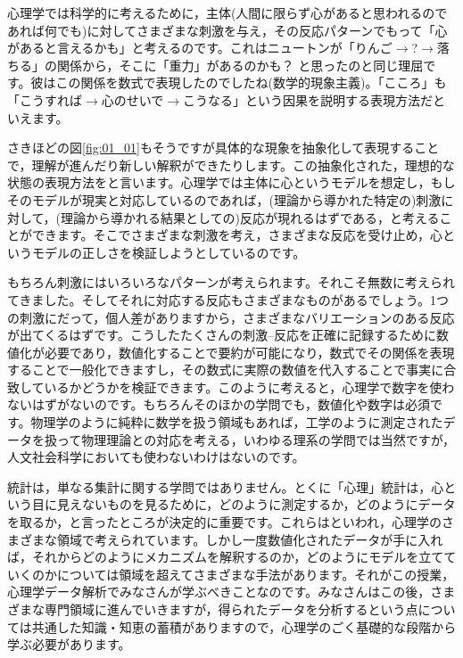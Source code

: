 \documentclass{ltjsbook}
\begin{document}
心理学では科学的に考えるために，主体(人間に限らず心があると思われるのであれば何でも)に対してさまざまな刺激を与え，その反応パターンでもって「心があると言えるかも」と考えるのです。これはニュートンが「りんご$\to$?$\to$落ちる」の関係から，そこに「重力」があるのかも？ と思ったのと同じ理屈です。彼はこの関係を数式で表現したのでしたね(数学的現象主義)。「こころ」も「こうすれば$\to$心のせいで$\to$こうなる」という因果を説明する表現方法だといえます。

さきほどの図\ref{fig:01_01}もそうですが具体的な現象を抽象化して表現することで，理解が進んだり新しい解釈ができたりします。この抽象化された，理想的な状態の表現方法をと言います。心理学では主体に心というモデルを想定し，もしそのモデルが現実と対応しているのであれば，(理論から導かれた特定の)刺激に対して，(理論から導かれる結果としての)反応が現れるはずである，と考えることができます。そこでさまざまな刺激を考え，さまざまな反応を受け止め，心というモデルの正しさを検証しようとしているのです。

もちろん刺激にはいろいろなパターンが考えられます。それこそ無数に考えられてきました。そしてそれに対応する反応もさまざまなものがあるでしょう。1つの刺激にだって，個人差がありますから，さまざまなバリエーションのある反応が出てくるはずです。こうしたたくさんの刺激--反応を正確に記録するために数値化が必要であり，数値化することで要約が可能になり，数式でその関係を表現することで一般化できますし，その数式に実際の数値を代入することで事実に合致しているかどうかを検証できます。このように考えると，心理学で数字を使わないはずがないのです。もちろんそのほかの学問でも，数値化や数字は必須です。物理学のように純粋に数学を扱う領域もあれば，工学のように測定されたデータを扱って物理理論との対応を考える，いわゆる理系の学問では当然ですが，人文社会科学においても使わないわけはないのです。

統計は，単なる集計に関する学問ではありません。とくに「心理」統計は，心という目に見えないものを見るために，どのように測定するか，どのようにデータを取るか，と言ったところが決定的に重要です。これらはといわれ，心理学のさまざまな領域で考えられています。しかし一度数値化されたデータが手に入れば，それからどのようにメカニズムを解釈するのか，どのようにモデルを立てていくのかについては領域を超えてさまざまな手法があります。それがこの授業，心理学データ解析でみなさんが学ぶべきことなのです。みなさんはこの後，さまざまな専門領域に進んでいきますが，得られたデータを分析するという点については共通した知識・知恵の蓄積がありますので，心理学のごく基礎的な段階から学ぶ必要があります。
\end{document}
